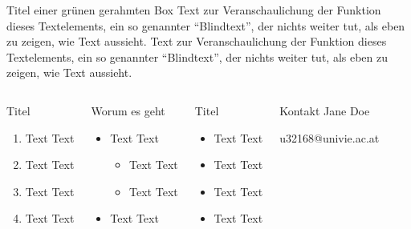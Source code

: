 \documentclass[naustrian,portrait]{univie-ling-poster}
\begin{document}
\begin{frame}
\begin{greenframedbox}{Titel einer grünen gerahmten Box}
	Text zur Veranschaulichung der Funktion dieses Textelements, ein so
	genannter \enquote{Blindtext}, der nichts weiter tut, als eben zu zeigen,
	wie Text aussieht. Text zur Veranschaulichung der Funktion dieses Textelements, ein so
	genannter \enquote{Blindtext}, der nichts weiter tut, als eben zu zeigen,
	wie Text aussieht.
\end{greenframedbox}

\begin{columns}[t, totalwidth=\textwidth]


\begin{redbox}{Titel}
	\begin{enumerate}
	\item Text Text
	\item Text Text
	\item Text Text
	\item Text Text
	\end{enumerate}
\end{redbox}


\begin{bluebox}{Worum es geht}
	\begin{itemize}
	\item Text Text
		\begin{itemize}
		\item Text Text
		\item Text Text
		\end{itemize}
	\item Text Text
	\end{itemize}
\end{bluebox}



\begin{bluebox}{Titel}
	\begin{itemize}
	\item Text Text
	\item Text Text
	\item Text Text
	\item Text Text
	\end{itemize}
\end{bluebox}

\begin{greenbox}{Kontakt}
   Jane Doe

   u32168@univie.ac.at
\end{greenbox}

\end{columns}%

\end{frame}%
\end{document}
